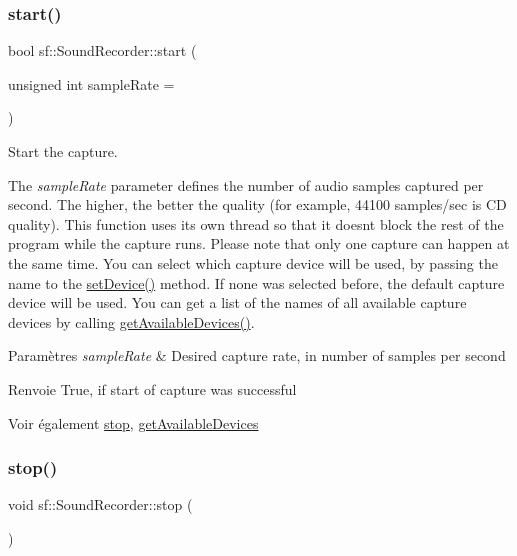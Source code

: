 \subsubsection{\texorpdfstring{start()}{start()}}
{\footnotesize\ttfamily bool sf\+::\+Sound\+Recorder\+::start (\begin{DoxyParamCaption}\item[{unsigned int}]{sample\+Rate = {} }\end{DoxyParamCaption})}



Start the capture. 

The {\itshape sample\+Rate} parameter defines the number of audio samples captured per second. The higher, the better the quality (for example, 44100 samples/sec is CD quality). This function uses its own thread so that it doesn\textquotesingle{}t block the rest of the program while the capture runs. Please note that only one capture can happen at the same time. You can select which capture device will be used, by passing the name to the \hyperlink{classsf_1_1SoundRecorder_a8eb3e473292c16e874322815836d3cd3}{set\+Device()} method. If none was selected before, the default capture device will be used. You can get a list of the names of all available capture devices by calling \hyperlink{classsf_1_1SoundRecorder_a26198c5c11efcd61f426f326fe314afe}{get\+Available\+Devices()}.


\begin{DoxyParams}{Paramètres}
{\em sample\+Rate} & Desired capture rate, in number of samples per second\\
\hline
\end{DoxyParams}
\begin{DoxyReturn}{Renvoie}
True, if start of capture was successful
\end{DoxyReturn}
\begin{DoxySeeAlso}{Voir également}
\hyperlink{classsf_1_1SoundRecorder_a8d9c8346aa9aa409cfed4a1101159c4c}{stop}, \hyperlink{classsf_1_1SoundRecorder_a26198c5c11efcd61f426f326fe314afe}{get\+Available\+Devices} 
\end{DoxySeeAlso}
\mbox{\label{classsf_1_1SoundRecorder_a8d9c8346aa9aa409cfed4a1101159c4c}} 
\subsubsection{\texorpdfstring{stop()}{stop()}}
{\footnotesize\ttfamily void sf\+::\+Sound\+Recorder\+::stop (\begin{DoxyParamCaption}{ }\end{DoxyParamCaption})}




